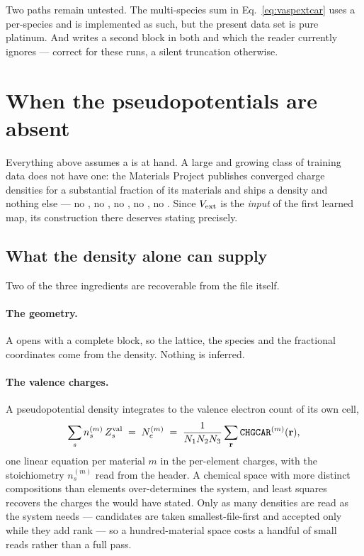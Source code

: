 \begin{pwarn}
Two paths remain untested. The multi-species sum in Eq.~\eqref{eq:vaspextcar}
uses a per-species  and is implemented as such, but the present data
set is pure platinum. And  writes a second block in both 
and  which the reader currently ignores --- correct for these
 runs, a silent truncation otherwise.
\end{pwarn}

\section{When the pseudopotentials are absent}
\label{sec:vext-without-potcar}

Everything above assumes a  is at hand. A large and growing class
of training data does not have one: the Materials Project publishes converged
charge densities for a substantial fraction of its materials and ships a
density and nothing else --- no , no , no
, no , no . Since $V_{\mathrm{ext}}$ is the
\emph{input} of the first learned map, its construction there deserves stating
precisely.

\subsection{What the density alone can supply}

Two of the three ingredients are recoverable from the file itself.

\paragraph{The geometry.} A  opens with a complete 
block, so the lattice, the species and the fractional coordinates come from the
density. Nothing is inferred.

\paragraph{The valence charges.} A pseudopotential density integrates to the
valence electron count of its own cell,
\begin{equation}
  \label{eq:zvalsystem}
  \sum_s n^{(m)}_s\, Z^{\mathrm{val}}_s \;=\; N^{(m)}_e
  \;=\; \frac{1}{N_1N_2N_3}\sum_{\mathbf{r}} \texttt{CHGCAR}^{(m)}(\mathbf{r}),
\end{equation}
one linear equation per material $m$ in the per-element charges, with the
stoichiometry $n^{(m)}_s$ read from the header. A chemical space with more
distinct compositions than elements over-determines the system, and least
squares recovers the charges the  would have stated. Only as many
densities are read as the system needs --- candidates are taken
smallest-file-first and accepted only while they add rank --- so a
hundred-material space costs a handful of small reads rather than a full pass.

